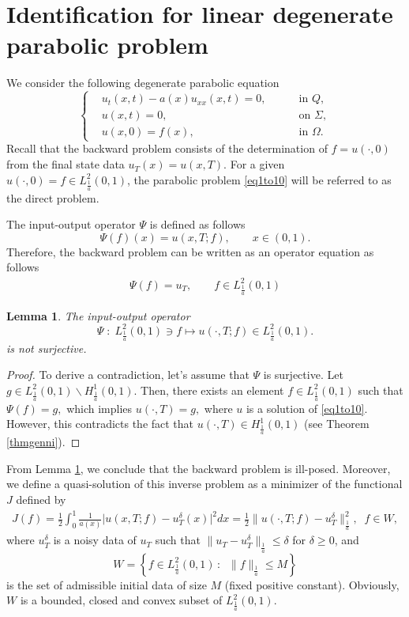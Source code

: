\documentclass[reqno]{amsart}
\theoremstyle{plain}
\newtheorem{lemma}[theorem]{Lemma}
\theoremstyle{remark}
\numberwithin{equation}{section}
\begin{document}
\section{Identification for linear degenerate parabolic problem}\label{sec4}
We consider the following degenerate parabolic equation 
\begin{equation}
    \left\{
\begin{aligned}
& u_{t}(x,t) -a(x) u_{xx}(x,t)=0, &&\quad \text { in } Q,\\
& u(x,t)=0, &&\quad \text{ on } \Sigma,\\
&u(x,0)=f(x), &&\quad \text { in } \Omega.
\label{eq1to10}
\end{aligned}
\right.
\end{equation}
Recall that the backward problem consists of the determination of $f=u(\cdot,0)$ from the final state data $u_{T}(x)=u(x,T).$ For a given $u(\cdot,0)=f \in L^2_{\frac{1}{a}}(0,1)$, the parabolic problem \eqref{eq1to10} will be referred to as the direct problem.

The input-output operator $\Psi$ is defined as follows
$$\Psi(f)(x)=u(x,T;f), \qquad x\in (0,1).$$
Therefore, the backward problem can be written as an operator equation as follows
\begin{align*}
    \Psi(f)=u_{T}, \qquad f\in L^2_{\frac{1}{a}}(0,1) 
\end{align*}
\begin{lemma}\label{lemma1}
    The input-output operator
    $$\Psi\;:\; L^2_{\frac{1}{a}}(0,1) \ni f \longmapsto u(\cdot,T;f)\in L^2_{\frac{1}{a}}(0,1).$$
    is not surjective.
\end{lemma}
\begin{proof}
    To derive a contradiction, let's assume that $\Psi$ is surjective. Let $g \in L^2_{\frac{1}{a}}(0,1)\backslash H^1_{\frac{1}{a}}(0,1).$ Then, there exists an element $f \in L^2_{\frac{1}{a}}(0,1)$ such that $\Psi(f)=g,$ which implies $u(\cdot,T)=g,$ where $u$ is a solution of \eqref{eq1to10}. However, this contradicts the fact that $u(\cdot,T)\in  H^1_{\frac{1}{a}}(0,1) $ (see Theorem \ref{thmgenni}).
\end{proof}
From Lemma \ref{lemma1}, we conclude that the backward problem is ill-posed. Moreover, we define a quasi-solution of this inverse problem as a minimizer of the functional $J$ defined by
\begin{align*}
    J(f)=\frac{1}{2}\int_{0}^{1}\frac{1}{a(x)}\vert u(x,T;f)-u^{\delta}_{T}(x)\vert^2dx=\frac{1}{2}\|u(\cdot,T;f)-u^{\delta}_T\|^2_{\frac{1}{a}}, \;\; f\in W,
\end{align*}
where $u^{\delta}_T$ is a noisy data of $u_T$ such that $\|u_T-u^{\delta}_T\|_{\frac{1}{a}} \leqslant \delta$ for $\delta\geqslant 0$, and   $$W=\left\lbrace f \in L_{\frac{1}{a}}^2(0,1)\,:\; \; \|f\|_{\frac{1}{a}}\leqslant M\right\rbrace$$
is the set of admissible initial data of size $M$ (fixed positive constant). Obviously, $W$ is a bounded, closed and convex subset of $L_{\frac{1}{a}}^2(0,1).$
\end{document}
